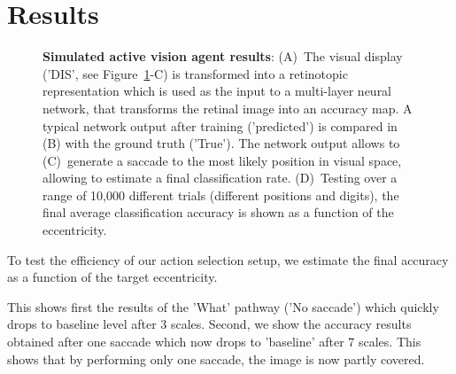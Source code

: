 \section{Results}
\label{sec:results}



\begin{figure}%
\caption{
{\bf Simulated active vision agent results}: 
(A)~The visual display ('DIS', see  Figure~\ref{fig:results}-C)  is transformed into a retinotopic representation which is used as the input to a multi-layer neural network, that transforms the retinal image into an accuracy map. A typical network output after training ('predicted') is compared in (B) with the ground truth ('True'). The network output allows to (C)~generate a saccade to the most likely position in visual space, allowing to estimate a final classification rate. (D)~Testing over a range of 10,000 different trials (different positions and digits), the final average classification accuracy is shown as a function of the eccentricity.
\label{fig:results}}%
\end{figure}%

To test the efficiency of our action selection setup, we estimate the final accuracy as a function of the target eccentricity.

This shows first the results of the 'What' pathway ('No saccade') which quickly drops to baseline level after 3 scales. Second, we show the accuracy results obtained after one saccade which now drops to 'baseline' after 7 scales. This shows that by performing only one saccade, the image is now partly covered.


